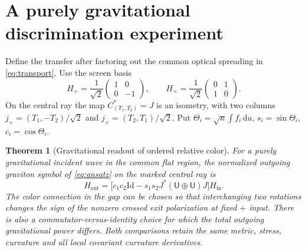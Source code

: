 \documentclass[11pt]{article}
\newtheorem{theorem}{Theorem}
\newcommand{\dd}{\mathrm d}
\newcommand{\Id}{\mathrm{Id}}
\begin{document}
\section{A purely gravitational discrimination experiment}

Define the transfer after factoring out the common optical spreading in \eqref{eq:transport}. Use the screen basis
\[
 H_+=\frac{1}{\sqrt2}\begin{pmatrix}1&0\\0&-1\end{pmatrix},
 \qquad
 H_\times=\frac{1}{\sqrt2}\begin{pmatrix}0&1\\1&0\end{pmatrix}.
\]
On the central ray the map \(C^*_{(T_1,T_2)}=J\) is an isometry, with two columns \(j_+=(T_1,-T_2)/\sqrt2\) and \(j_\times=(T_2,T_1)/\sqrt2\). Put \(\Theta_i=\sqrt\kappa\int f_i\,\dd u\), \(s_i=\sin\Theta_i\), \(c_i=\cos\Theta_i\).

\begin{theorem}[Gravitational readout of ordered relative color]\label{thm:main}
 For a purely gravitational incident wave in the common flat region, the normalized outgoing graviton symbol of \eqref{eq:ansatz} on the marked central ray is
 \begin{equation}\label{eq:trans}
 H_{\mathrm{out}}
    =\big[c_1c_2\Id-s_1s_2 J^*(\mathsf U\oplus\mathsf U)J\big]H_{\mathrm{in}}.
 \end{equation}
 The color connection in the gap can be chosen so that interchanging two rotations changes the sign of the nonzero crossed exit polarization at fixed \(+\) input. There is also a commutator-versus-identity choice for which the total outgoing gravitational power differs. Both comparisons retain the same metric, stress, curvature and all local covariant curvature derivatives.
\end{theorem}
\end{document}
